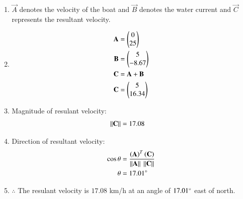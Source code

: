 \renewcommand{\theequation}{\theenumi}
\begin{enumerate}

\item \begin{flushleft}
 $\vec{A}$ denotes the velocity of the boat and $
\vec{B}$ denotes the water current and $\vec{C}$ represents the resultant velocity. 
\end{flushleft}

\item \begin{align}
\mathbf{A} &=\begin{pmatrix}0\\25\end{pmatrix} \label{eq:constr_a_motion_in_a_plane}\\
\mathbf{B} &=\begin{pmatrix}5\\-8.67\end{pmatrix} \label{eq:constr_b_motion_in_a_plane}\\
\mathbf{C} &= \mathbf{A} + \mathbf{B}\\
\mathbf{C} &= \begin{pmatrix}5\\16.34\end{pmatrix}
\end{align}

\item Magnitude of resulant velocity:
\begin{align}
\left\lVert\mathbf{C}\right\rVert &= 17.08
\end{align}

\item Direction of resultant velocity:
\begin{align}
\cos{\theta} &= \frac{\left(\mathbf{A}\right)^T\left(\mathbf{C}\right)}{\left\lVert\mathbf{A}\right\rVert\ \left\lVert\mathbf{C}\right\rVert}\\
\theta &= 17.01\degree
\end{align}

\item \begin{flushleft}
$\therefore$ The resulant velocity is $17.08$ km/h at an angle of $17.01\degree$ east of north.
\end{flushleft}


\end{enumerate}
